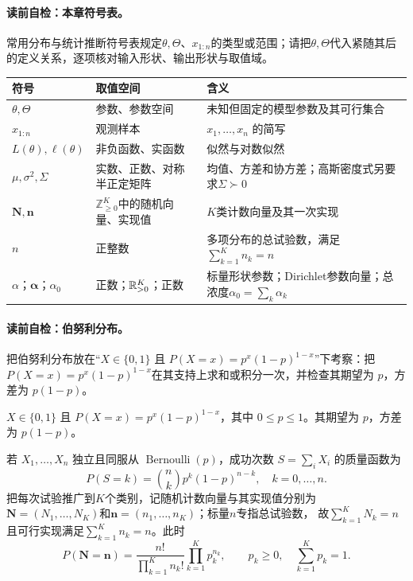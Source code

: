 \paragraph{读前自检：本章符号表。}常用分布与统计推断符号表规定$\theta,\Theta$、$x_{1:n}$的类型或范围；请把$\theta,\Theta$代入紧随其后的定义关系，逐项核对输入形状、输出形状与取值域。\par

\begin{symboltablebox}
\begin{tabularx}{\linewidth}{@{}l l X@{}}
\toprule 符号 & 取值空间 & 含义\\ \midrule
$\theta,\Theta$ & 参数、参数空间 & 未知但固定的模型参数及其可行集合\\
$x_{1:n}$ & 观测样本 & $x_1,\ldots,x_n$ 的简写\\
$L(\theta),\ell(\theta)$ & 非负函数、实函数 & 似然与对数似然\\
$\mu,\sigma^2,\Sigma$ & 实数、正数、对称半正定矩阵 & 均值、方差和协方差；高斯密度式另要求$\Sigma\succ0$\\
$\mathbf N,\mathbf n$ & $\mathbb Z_{\geq0}^K$中的随机向量、实现值 & $K$类计数向量及其一次实现\\
$n$ & 正整数 & 多项分布的总试验数，满足$\sum_{k=1}^K n_k=n$\\
$\alpha$；$\boldsymbol\alpha$；$\alpha_0$ & 正数；$\mathbb{R}_{>0}^K$；正数 & 标量形状参数；Dirichlet参数向量；总浓度$\alpha_0=\sum_k\alpha_k$\\
\bottomrule
\end{tabularx}
\end{symboltablebox}

\paragraph{读前自检：伯努利分布。}把伯努利分布放在“$X\in\{0,1\}$ 且 $P(X=x)=p^x(1-p)^{1-x}$”下考察：把$P(X=x)=p^x(1-p)^{1-x}$在其支持上求和或积分一次，并检查其期望为 $p$，方差为 $p(1-p)$。\par

\label{struct:V1-C05-CH06}
\begin{definition}[伯努利分布]\label{struct:V1-C05-CH07}
$X\in\{0,1\}$ 且 $P(X=x)=p^x(1-p)^{1-x}$，其中 $0\le p\le1$。其期望为 $p$，方差为 $p(1-p)$。
\end{definition}
若 $X_1,\ldots,X_n$ 独立且同服从 $\operatorname{Bernoulli}(p)$，成功次数 $S=\sum_iX_i$ 的质量函数为
\[
P(S=k)=\binom nk p^k(1-p)^{n-k},\quad k=0,\ldots,n.
\]
把每次试验推广到$K$个类别，记随机计数向量与其实现值分别为
$\mathbf N=(N_1,\ldots,N_K)$和$\mathbf n=(n_1,\ldots,n_K)$；标量$n$专指总试验数，
故$\sum_{k=1}^K N_k=n$且可行实现满足$\sum_{k=1}^K n_k=n$。此时
\[
P(\mathbf N=\mathbf n)=\frac{n!}{\prod_{k=1}^K n_k!}
\prod_{k=1}^{K}p_k^{n_k},\qquad
p_k\geq0,\quad\sum_{k=1}^Kp_k=1.
\]

